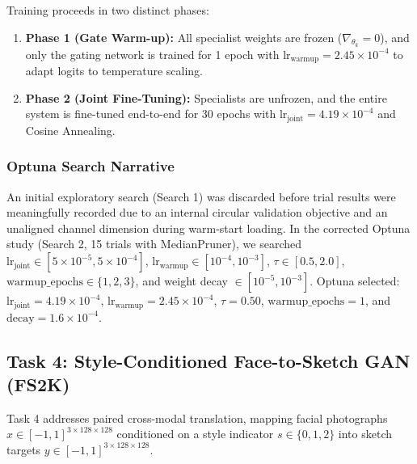 \documentclass[conference]{IEEEtran}
\begin{document}
Training proceeds in two distinct phases:
\begin{enumerate}
    \item \textbf{Phase 1 (Gate Warm-up):} All specialist weights are frozen ($\nabla_{\theta_k} = 0$), and only the gating network is trained for 1 epoch with $\text{lr}_{\text{warmup}} = 2.45\times 10^{-4}$ to adapt logits to temperature scaling.
    \item \textbf{Phase 2 (Joint Fine-Tuning):} Specialists are unfrozen, and the entire system is fine-tuned end-to-end for 30 epochs with $\text{lr}_{\text{joint}} = 4.19\times 10^{-4}$ and Cosine Annealing.
\end{enumerate}

\subsubsection{Optuna Search Narrative}
An initial exploratory search (Search 1) was discarded before trial results were meaningfully recorded due to an internal circular validation objective and an unaligned channel dimension during warm-start loading. In the corrected Optuna study (Search 2, 15 trials with MedianPruner), we searched $\text{lr}_{\text{joint}} \in [5\times 10^{-5}, 5\times 10^{-4}]$, $\text{lr}_{\text{warmup}} \in [10^{-4}, 10^{-3}]$, $\tau \in [0.5, 2.0]$, $\text{warmup\_epochs} \in \{1, 2, 3\}$, and weight decay $\in [10^{-5}, 10^{-3}]$. Optuna selected: $\text{lr}_{\text{joint}} = 4.19\times 10^{-4}$, $\text{lr}_{\text{warmup}} = 2.45\times 10^{-4}$, $\tau = 0.50$, $\text{warmup\_epochs} = 1$, and $\text{decay} = 1.6\times 10^{-4}$.

\subsection{Task 4: Style-Conditioned Face-to-Sketch GAN (FS2K)}
Task 4 addresses paired cross-modal translation, mapping facial photographs $x \in [-1, 1]^{3 \times 128 \times 128}$ conditioned on a style indicator $s \in \{0, 1, 2\}$ into sketch targets $y \in [-1, 1]^{3 \times 128 \times 128}$.
\end{document}
